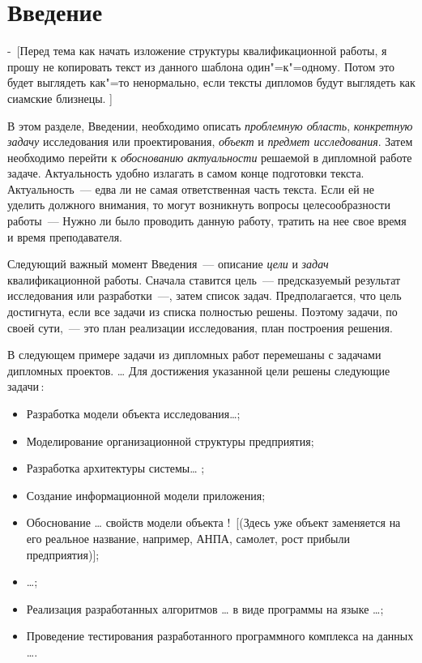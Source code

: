 \documentclass[a4paper,14pt, openany, twoside, draft]{extbook} %
\newcommand{\rrr}[2][rcolor]{\noindent%
\textcolor{eclr}{-\ [}\textcolor{#1}{#2}\textcolor{eclr}{]}}
\newcommand{\nnn}[2][ncolor]{\noindent%
\textcolor{eclr}{!\ [}\textcolor{#1}{#2}\textcolor{eclr}{]}}
\begin{document}
\newpage
\chapter*{Введение}

\rrr{Перед тема как начать изложение структуры квалификационной работы, я прошу не копировать текст из данного шаблона один"=к"=одному.  Потом это будет выглядеть как"=то ненормально, если тексты дипломов будут выглядеть как сиамские близнецы. }

В этом разделе, Введении, необходимо описать \emph{проблемную область}, \emph{конкретную задачу} исследования или проектирования, \emph{объект} и \emph{предмет исследования}.  Затем необходимо перейти к \emph{обоснованию актуальности} решаемой в дипломной работе задаче.  Актуальность удобно излагать в самом конце подготовки текста.  Актуальность~--- едва ли не самая ответственная часть текста.  Если ей не уделить должного внимания, то могут возникнуть вопросы целесообразности работы~--- Нужно ли было проводить данную работу, тратить на нее свое время и время преподавателя.

Следующий важный момент Введения~--- описание \emph{цели} и \emph{задач} квалификационной работы.  Сначала ставится цель~--- предсказуемый результат исследования или разработки~---, затем список задач.  Предполагается, что цель достигнута, если все задачи из списка полностью решены.  Поэтому задачи, по своей сути,~--- это план реализации исследования, план построения решения.

В следующем примере задачи из дипломных работ перемешаны с задачами дипломных проектов. \ldots{} Для достижения указанной цели решены следующие задачи\,:
\begin{itemize}
\item Разработка модели объекта исследования\ldots{}; %
\item Моделирование организационной структуры предприятия;
\item Разработка архитектуры системы\ldots{} ;
\item Создание информационной модели приложения;
\item Обоснование \ldots{} свойств модели объекта \nnn{(Здесь уже объект заменяется на его реальное название, например, АНПА, самолет, рост прибыли предприятия)};
\item \ldots{};
\item Реализация разработанных алгоритмов \ldots{} в виде программы на языке \ldots{};
\item Проведение тестирования разработанного программного комплекса на данных \ldots{}.
\end{itemize}
\end{document}
